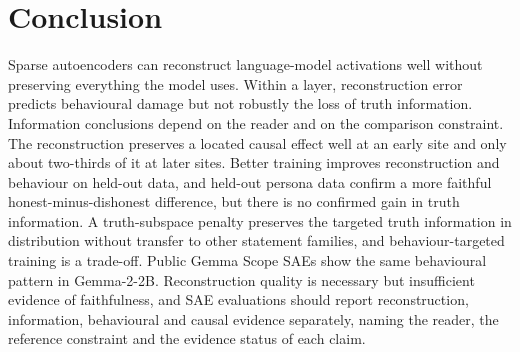 \section{Conclusion}\label{sec:conclusion}

Sparse autoencoders can reconstruct language-model activations well without preserving everything the model uses.
Within a layer, reconstruction error predicts behavioural damage but not robustly the loss of truth information.
Information conclusions depend on the reader and on the comparison constraint. The reconstruction preserves a located
causal effect well at an early site and only about two-thirds of it at later sites. Better training improves
reconstruction and behaviour on held-out data, and held-out persona data confirm a more faithful honest-minus-dishonest
difference, but there is no confirmed gain in truth information. A truth-subspace penalty preserves the targeted truth
information in distribution without transfer to other statement families, and behaviour-targeted training is a
trade-off. Public Gemma Scope SAEs show the same behavioural pattern in Gemma-2-2B. Reconstruction quality
is necessary but insufficient evidence of faithfulness, and SAE evaluations should report reconstruction, information,
behavioural and causal evidence separately, naming the reader, the reference constraint and the evidence status of each
claim.

